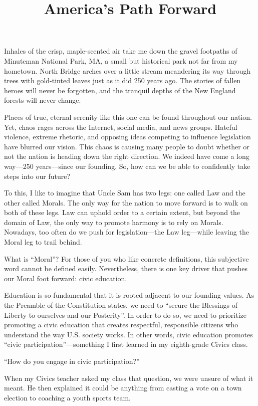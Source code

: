 \documentclass[12pt]{article}
\begin{document}
\title{America's Path Forward}
\author{}
\date{}
\maketitle

Inhales of the crisp, maple-scented air take me down the gravel footpaths of Minuteman National Park, MA, a small but historical park not far from my hometown. North Bridge arches over a little stream meandering its way through trees with gold-tinted leaves just as it did 250 years ago. The stories of fallen heroes will never be forgotten, and the tranquil depths of the New England forests will never change.

Places of true, eternal serenity like this one can be found throughout our nation. Yet, chaos rages across the Internet, social media, and news groups. Hateful violence, extreme rhetoric, and opposing ideas competing to influence legislation have blurred our vision. This chaos is causing many people to doubt whether or not the nation is heading down the right direction. We indeed have come a long way---250 years---since our founding. So, how can we be able to confidently take steps into our future?

To this, I like to imagine that Uncle Sam has two legs: one called Law and the other called Morals. The only way for the nation to move forward is to walk on both of these legs. Law can uphold order to a certain extent, but beyond the domain of Law, the only way to promote harmony is to rely on Morals. Nowadays, too often do we push for legislation---the Law leg---while leaving the Moral leg to trail behind.

What is ``Moral''? For those of you who like concrete definitions, this subjective word cannot be defined easily. Nevertheless, there is one key driver that pushes our Moral foot forward: civic education.

Education is so fundamental that it is rooted adjacent to our founding values. As the Preamble of the Constitution states, we need to ``secure the Blessings of Liberty to ourselves and our Posterity''. In order to do so, we need to prioritize promoting a civic education that creates respectful, responsible citizens who understand the way U.S. society works. In other words, civic education promotes ``civic participation''---something I first learned in my eighth-grade Civics class.

``How do you engage in civic participation?''

When my Civics teacher asked my class that question, we were unsure of what it meant. He then explained it could be anything from casting a vote on a town election to coaching a youth sports team.
\end{document}
